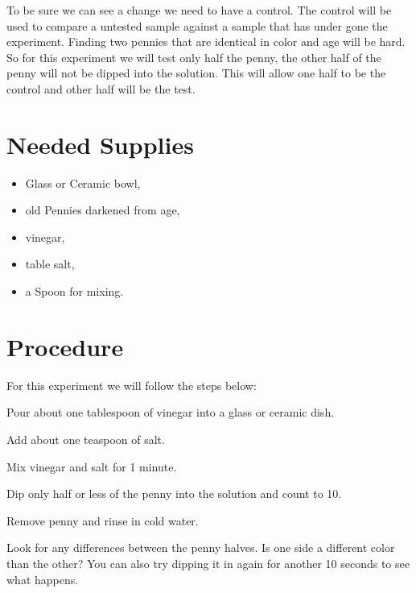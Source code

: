 \documentclass[12pt,twoside,a4]{article}
\begin{document}
To be sure we can see a change we need to have a control.  The control will be used to compare a untested sample against a sample that has under gone the experiment.  Finding two pennies that are identical in color and age will be hard.  So for this experiment we will test only half the penny, the other half of the penny will not be dipped into the solution.  This will allow one half to be the control and other half will be the test.

\section{Needed Supplies}
\begin{itemize}%
\item Glass or Ceramic bowl,
\item old Pennies darkened from age,
\item vinegar,
\item table salt,
\item a Spoon for mixing.
\end{itemize}

\section{Procedure}
For this experiment we will follow the steps below:
\begin{steps}
\setlength\itemindent{25pt}
\item Pour about one tablespoon of vinegar into a glass or ceramic dish.
\item Add about one teaspoon of salt.
\item Mix vinegar and salt for 1 minute.
\item Dip only half or less of the penny into the solution and count to 10.
\item Remove penny and rinse in cold water.
\item Look for any differences between the penny halves.  Is one side a different color than the other?  You can also try dipping it in again for another 10 seconds to see what happens.
\end{steps}
\end{document}
